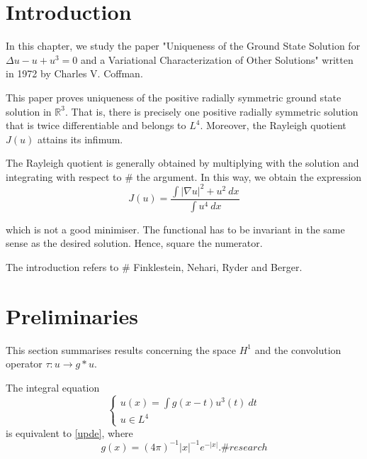 \documentclass{article}
\newcommand{\be}{\begin{equation}}
\newcommand{\ee}{\end{equation}}
\newcommand{\new}{\color{NavyBlue}}
\newcommand{\R}{\mathbb{R}}
\numberwithin{equation}{section}
\begin{document}
\section{Introduction}
In this chapter, we study the paper "Uniqueness of the Ground State Solution for $\Delta u - u + u^3 = 0$ and a Variational Characterization of Other Solutions" written in 1972 by Charles V. Coffman. 

{\new This paper proves uniqueness of the positive radially symmetric ground state solution in $\R^3$. That is, there is precisely one positive radially symmetric solution that is twice differentiable and belongs to $L^4$. Moreover, the Rayleigh quotient $J(u)$ attains its infimum.

The Rayleigh quotient is generally obtained by multiplying with the solution and integrating with respect to \# the argument. In this way, we obtain the expression $$J(u) = \dfrac{\int\left|\nabla u\right|^2+u^2~dx}{\int u^4~dx}$$

which is not a good minimiser. The functional has to be invariant in the same sense as the desired solution. Hence, square the numerator.}

The introduction refers to \# Finklestein, Nehari, Ryder and Berger.

\begin{comment}
The partial differential equation \be\label{upde}\Delta u - u + u^3 = 0\ee is similar to \# of chapter 2.

The equation $$R'' + \frac{1}{r} R' - R + R^3 = 0$$ has a unique ground state solution due to the result by Coffman. The ground state solution $u$ is radially symmetric and positive everywhere. Moreover, $u = \phi_1 \in C^2 \cap L^4$, where $\phi_n(x) = v_n(|x|)$ are solutions to \eqref{upde}.
\end{comment}

\section{Preliminaries}
{\new This section summarises results concerning the space $H^1$ and the convolution operator $\tau: u\to g\ast u$.}

The integral equation 
\be \begin{cases}u(x) = \int g(x-t) u^3(t)~dt \\ u \in L^4\end{cases} \ee
is equivalent to \eqref{upde},
where
\be g(x) = (4\pi)^{-1} |x|^{-1} e^{-|x|}. \#research\ee
\end{document}
